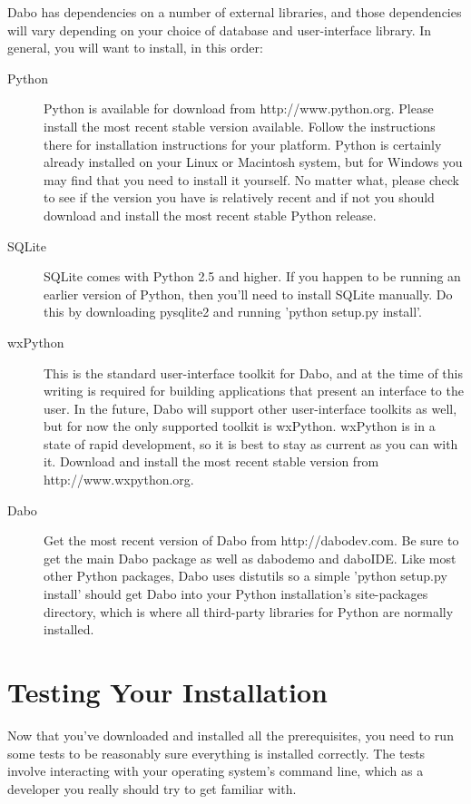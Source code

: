 Dabo has dependencies on a number of external libraries, and those dependencies will vary depending on your choice of database and user-interface library. In general, you will want to install, in this order:
\begin{description}
	\item[Python] Python is available for download from http://www.python.org.  Please install the most recent stable version available. Follow the instructions there for installation instructions for your platform. Python is certainly already installed on your Linux or Macintosh system, but for Windows you may find that you need to install it yourself. No matter what, please check to see if the version you have is relatively recent and if not you should download and install the most recent stable Python release.

	\item[SQLite] SQLite comes with Python 2.5 and higher. If you happen to be running an earlier version of Python, then you'll need to install SQLite manually. Do this by downloading pysqlite2 and running 'python setup.py install'.

	\item[wxPython] This is the standard user-interface toolkit for Dabo, and at the time of this writing is required for building applications that present an interface to the user. In the future, Dabo will support other user-interface toolkits as well, but for now the only supported toolkit is wxPython. wxPython is in a state of rapid development, so it is best to stay as current as you can with it. Download and install the most recent stable version from http://www.wxpython.org.

	\item[Dabo] Get the most recent version of Dabo from http://dabodev.com. Be sure to get the main Dabo package as well as dabodemo and daboIDE. Like most other Python packages, Dabo uses distutils so a simple 'python setup.py install' should get Dabo into your Python installation's site-packages directory, which is where all third-party libraries for Python are normally installed.
\end{description}

\section{Testing Your Installation}

Now that you've downloaded and installed all the prerequisites, you need to run some tests to be reasonably sure everything is installed correctly. The tests involve interacting with your operating system's command line, which as a developer you really should try to get familiar with.

